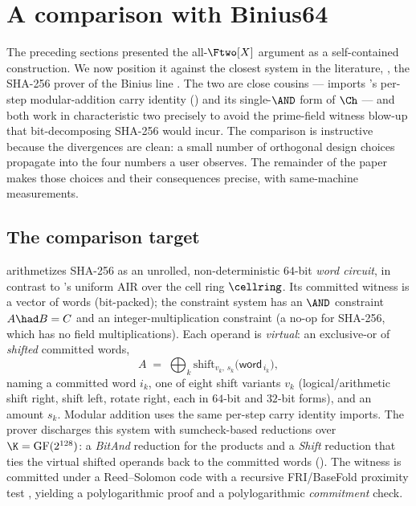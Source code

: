 \section{A comparison with Binius64}
\label{sec:cmp}

The preceding sections presented the all-$\Ftwo[X]$ argument as a
self-contained construction. We now position it against the closest
system in the literature, \binius{} \cite{binius64repo}, the SHA-256
prover of the Binius line \cite{binius,fribinius}. The two are close
cousins --- \zinc{} imports \binius{}'s per-step modular-addition carry
identity () and its single-$\AND$ form of $\Ch$ --- and
both work in characteristic two precisely to avoid the prime-field
witness blow-up that bit-decomposing SHA-256 would incur. The comparison
is instructive because the divergences are clean: a small number of
orthogonal design choices propagate into the four numbers a user
observes. The remainder of the paper makes those choices and their
consequences precise, with same-machine measurements.

\subsection{The comparison target}
\label{sec:cmp-binius}

\binius{} arithmetizes SHA-256 as an unrolled, non-deterministic $64$-bit
\emph{word circuit}, in contrast to \zinc{}'s uniform AIR over the cell
ring $\cellring$. Its committed witness is a vector of words (bit-packed);
the constraint system has an $\AND$ constraint $A \had B = C$ and an
integer-multiplication constraint (a no-op for SHA-256, which has no field
multiplications). Each operand is \emph{virtual}: an exclusive-or of
\emph{shifted} committed words,
\[
  A \;=\; \bigoplus_k \mathrm{shift}_{v_k,\,s_k}\!\big(\mathsf{word}_{\,i_k}\big),
\]
naming a committed word $i_k$, one of eight shift variants $v_k$
(logical/arithmetic shift right, shift left, rotate right, each in
$64$-bit and $32$-bit forms), and an amount $s_k$. Modular addition uses
the same per-step carry identity \zinc{} imports. The prover discharges
this system with sumcheck-based reductions over $\K=\mathrm{GF}(2^{128})$:
a \emph{BitAnd} reduction for the products and a \emph{Shift} reduction
that ties the virtual shifted operands back to the committed words
(). The witness is committed under a Reed--Solomon code
with a recursive FRI/BaseFold proximity test \cite{fri,basefold}, yielding
a polylogarithmic proof and a polylogarithmic \emph{commitment} check.

